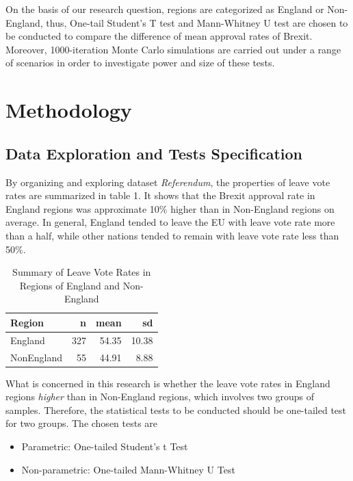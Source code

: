 \documentclass[]{article}
\begin{document}
On the basis of our research question, regions are categorized as
England or Non-England, thus, One-tail Student's T test and Mann-Whitney
U test are chosen to be conducted to compare the difference of mean
approval rates of Brexit. Moreover, 1000-iteration Monte Carlo
simulations are carried out under a range of scenarios in order to
investigate power and size of these tests.

\hypertarget{methodology}{%
\section{Methodology}\label{methodology}}

\hypertarget{data-exploration-and-tests-specification}{%
\subsection{Data Exploration and Tests
Specification}\label{data-exploration-and-tests-specification}}

By organizing and exploring dataset \emph{Referendum}, the properties of
leave vote rates are summarized in table 1. It shows that the Brexit
approval rate in England regions was approximate 10\% higher than in
Non-England regions on average. In general, England tended to leave the
EU with leave vote rate more than a half, while other nations tended to
remain with leave vote rate less than 50\%.

\begin{longtable}[t]{lrrr}
\caption{\label{tab:dataset}Summary of Leave Vote Rates in Regions of England and Non-England}\\
\toprule
Region & n & mean & sd\\
\midrule
England & 327 & 54.35 & 10.38\\
NonEngland & 55 & 44.91 & 8.88\\
\bottomrule
\end{longtable}

What is concerned in this research is whether the leave vote rates in
England regions \emph{higher} than in Non-England regions, which
involves two groups of samples. Therefore, the statistical tests to be
conducted should be one-tailed test for two groups. The chosen tests are

\begin{itemize}
\item
  Parametric: One-tailed Student's t Test
\item
  Non-parametric: One-tailed Mann-Whitney U Test
\end{itemize}
\end{document}
